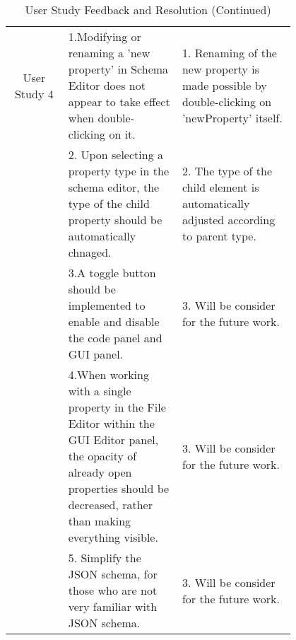 \begin{table*}

    \centering
    \small %
    \setlength{\extrarowheight}{5pt} %
    \renewcommand{\arraystretch}{1.5} %
    \begin{tabular}{|c|p{0.4\linewidth}|p{0.4\linewidth}|}
        \hline
        User Study 4 & 1.Modifying or renaming a 'new property' in Schema Editor does not appear to take effect when double-clicking on it. & 1. Renaming of the new property is made possible by double-clicking on 'newProperty' itself. \\
        \cline{2-3}
        & 2. Upon selecting a property type in the schema editor, the type of the child property should be automatically chnaged. & 2. The type of the child element is automatically adjusted according to parent type. \\
        \cline{2-3}
        & 3.A toggle button should be implemented to enable and disable the code panel and GUI panel. & 3. Will be consider for the future work. \\
        \cline{2-3}
        & 4.When working with a single property in the File Editor within the GUI Editor panel, the opacity of already open properties should be decreased, rather than making everything visible. & 3. Will be consider for the future work. \\
        \cline{2-3}
        & 5. Simplify the JSON schema, for those who are not very familiar with JSON schema. & 3. Will be consider for the future work. \\
        \hline

    \end{tabular}
    \caption{User Study Feedback and Resolution (Continued)}
\end{table*}

